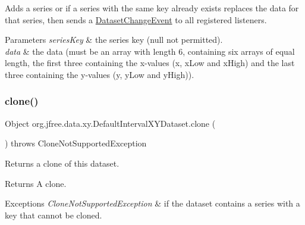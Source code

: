 Adds a series or if a series with the same key already exists replaces the data for that series, then sends a \mbox{\hyperlink{}{Dataset\+Change\+Event}} to all registered listeners.


\begin{DoxyParams}{Parameters}
{\em series\+Key} & the series key ({\ttfamily null} not permitted). \\
\hline
{\em data} & the data (must be an array with length 6, containing six arrays of equal length, the first three containing the x-\/values (x, x\+Low and x\+High) and the last three containing the y-\/values (y, y\+Low and y\+High)). \\
\hline
\end{DoxyParams}
\mbox{\label{classorg_1_1jfree_1_1data_1_1xy_1_1_default_interval_x_y_dataset_afa1ba47d8ed4807303769ba45afb4ad4}} 
\subsubsection{\texorpdfstring{clone()}{clone()}}
{\footnotesize\ttfamily Object org.\+jfree.\+data.\+xy.\+Default\+Interval\+X\+Y\+Dataset.\+clone (\begin{DoxyParamCaption}{ }\end{DoxyParamCaption}) throws Clone\+Not\+Supported\+Exception}

Returns a clone of this dataset.

\begin{DoxyReturn}{Returns}
A clone.
\end{DoxyReturn}

\begin{DoxyExceptions}{Exceptions}
{\em Clone\+Not\+Supported\+Exception} & if the dataset contains a series with a key that cannot be cloned. \\
\hline
\end{DoxyExceptions}
\mbox{\label{classorg_1_1jfree_1_1data_1_1xy_1_1_default_interval_x_y_dataset_a2ec3c43540e74602206cd5b5c649c0b9}} 
